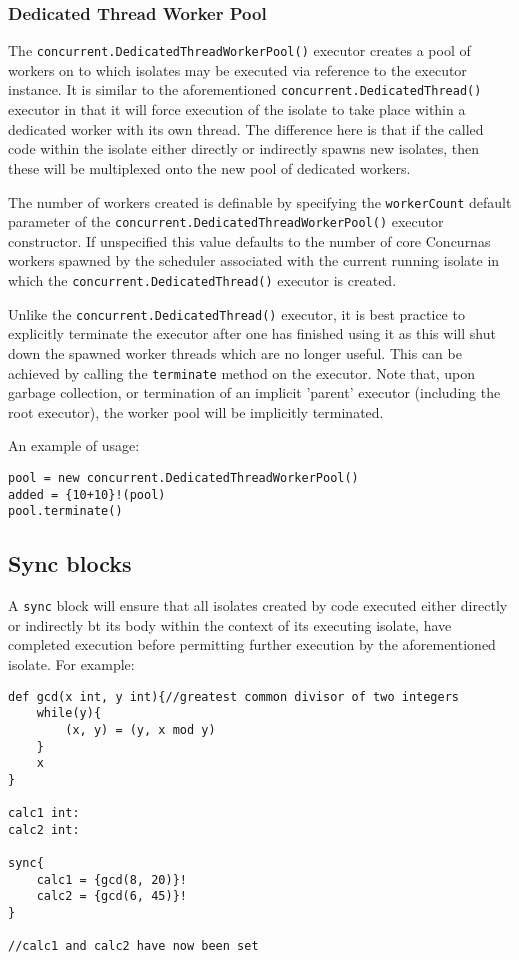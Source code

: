 \documentclass[conc-doc]{subfiles}
\begin{document}
\subsubsection{Dedicated Thread Worker Pool}
The \lstinline{concurrent.DedicatedThreadWorkerPool()} executor creates a pool of workers on to which isolates may be executed via  reference to the executor instance. It is similar to the aforementioned \lstinline{concurrent.DedicatedThread()} executor in that it will force execution of the isolate to take place within a dedicated worker with its own thread. The difference here is that if the called code within the isolate either directly or indirectly spawns new isolates, then these will be multiplexed onto the new pool of dedicated workers.

The number of workers created is definable by specifying the \lstinline{workerCount} default parameter of the \lstinline{concurrent.DedicatedThreadWorkerPool()} executor constructor. If unspecified this value defaults to the number of core Concurnas workers spawned by the scheduler associated with the current running isolate in which the \lstinline{concurrent.DedicatedThread()} executor is created.

Unlike the \lstinline{concurrent.DedicatedThread()} executor, it is best practice to explicitly terminate the executor after one has finished using it as this will shut down the spawned worker threads which are no longer useful. This can be achieved by calling the \lstinline{terminate} method on the executor. Note that, upon garbage collection, or termination of an implicit 'parent' executor (including the root executor), the worker pool will be implicitly terminated.

An example of usage:

\begin{lstlisting}
pool = new concurrent.DedicatedThreadWorkerPool()
added = {10+10}!(pool)
pool.terminate()
\end{lstlisting}

\subsection{Sync blocks}
A \lstinline{sync} block will ensure that all isolates created by code executed either directly or indirectly bt its body within the context of its executing isolate, have completed execution before permitting further execution by the aforementioned isolate. For example:

\begin{lstlisting}
def gcd(x int, y int){//greatest common divisor of two integers
	while(y){
		(x, y) = (y, x mod y)
	}
	x
}

calc1 int:
calc2 int:

sync{
	calc1 = {gcd(8, 20)}!
	calc2 = {gcd(6, 45)}!
}

//calc1 and calc2 have now been set
\end{lstlisting}
\end{document}

